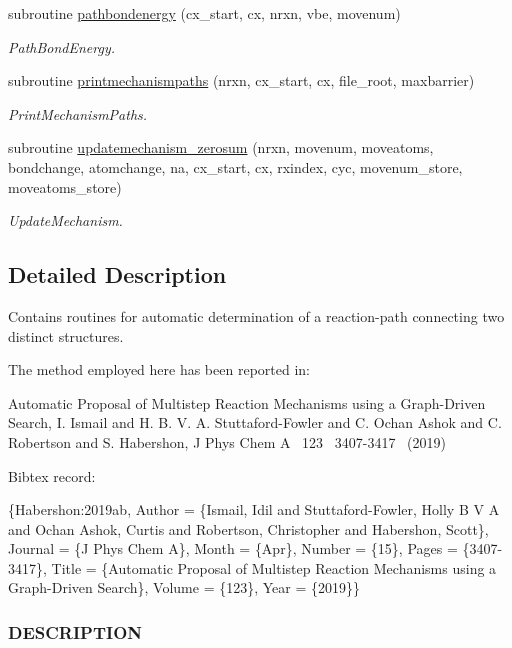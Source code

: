 \begin{DoxyCompactItemize}
subroutine \mbox{\hyperlink{namespacepathfinder_a87bea3e752b4f8db790f97d64d2c6b9a}{pathbondenergy}} (cx\+\_\+start, cx, nrxn, vbe, movenum)
\begin{DoxyCompactList}\small\item\em Path\+Bond\+Energy. \end{DoxyCompactList}\item 
subroutine \mbox{\hyperlink{namespacepathfinder_ab000582f6e17d2ac76cb52e246a70307}{printmechanismpaths}} (nrxn, cx\+\_\+start, cx, file\+\_\+root, maxbarrier)
\begin{DoxyCompactList}\small\item\em Print\+Mechanism\+Paths. \end{DoxyCompactList}\item 
subroutine \mbox{\hyperlink{namespacepathfinder_a25b775f7df0cf4f7bcdbfc0a97dcbbc4}{updatemechanism\+\_\+zerosum}} (nrxn, movenum, moveatoms, bondchange, atomchange, na, cx\+\_\+start, cx, rxindex, cyc, movenum\+\_\+store, moveatoms\+\_\+store)
\begin{DoxyCompactList}\small\item\em Update\+Mechanism. \end{DoxyCompactList}\end{DoxyCompactItemize}


\subsection{Detailed Description}
Contains routines for automatic determination of a reaction-\/path connecting two distinct structures. 

The method employed here has been reported in\+:

Automatic Proposal of Multistep Reaction Mechanisms using a Graph-\/\+Driven Search, I. Ismail and H. B. V. A. Stuttaford-\/\+Fowler and C. Ochan Ashok and C. Robertson and S. Habershon, J Phys Chem A  123  3407-\/3417  (2019)

Bibtex record\+:

\{Habershon\+:2019ab, Author = \{Ismail, Idil and Stuttaford-\/\+Fowler, Holly B V A and Ochan Ashok, Curtis and Robertson, Christopher and Habershon, Scott\}, Journal = \{J Phys Chem A\}, Month = \{Apr\}, Number = \{15\}, Pages = \{3407-\/3417\}, Title = \{Automatic Proposal of Multistep Reaction Mechanisms using a Graph-\/\+Driven Search\}, Volume = \{123\}, Year = \{2019\}\} 

 \subsubsection*{D\+E\+S\+C\+R\+I\+P\+T\+I\+ON }

